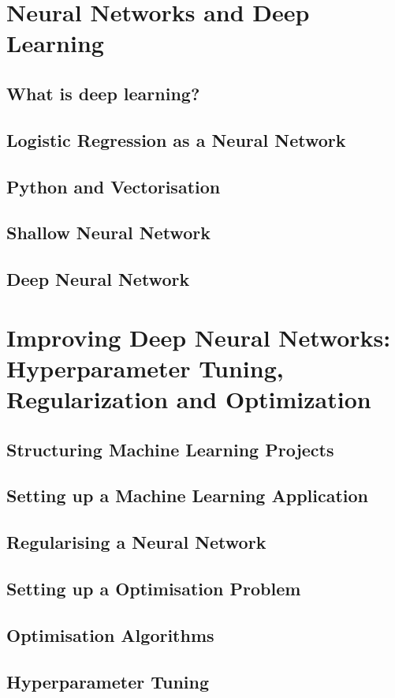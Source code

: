 \documentclass[a4paper, 11pt]{book}
\begin{document}
    \section{Neural Networks and Deep Learning}
    \subsection{What is deep learning?}
    \subsection{Logistic Regression as a Neural Network}
    \subsection{Python and Vectorisation}
    \subsection{Shallow Neural Network}
    \subsection{Deep Neural Network}

    \section{Improving Deep Neural Networks: Hyperparameter Tuning, Regularization and Optimization}
    \subsection{Structuring Machine Learning Projects}
    \subsection{Setting up a Machine Learning Application}
    \subsection{Regularising a Neural Network}
    \subsection{Setting up a Optimisation Problem}
    \subsection{Optimisation Algorithms}
    \subsection{Hyperparameter Tuning}
\end{document}
